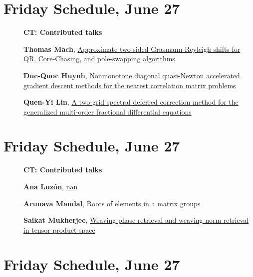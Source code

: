 \documentclass[ILAS2025-program.tex]{subfiles}
\begin{document}
\section*{Friday Schedule, June 27 }
        
        \begin{description}
    \item[] {\color{mstitle}\textbf{CT: Contributed talks}} 
    \item[] \hypertarget{up0410}{}\textbf{Thomas Mach}, \hyperlink{down0410}{Approximate two-sided Grasmann-Reyleigh shifts for QR, Core-Chasing, and pole-swapping algorithms}
        \item[] \hypertarget{up0411}{}\textbf{Duc-Quoc Huynh}, \hyperlink{down0411}{Nonmonotone diagonal quasi-Newton accelerated gradient descent methods for the nearest correlation matrix problems}
        \item[] \hypertarget{up0412}{}\textbf{Quen-Yi Lin}, \hyperlink{down0412}{A two-grid spectral deferred correction method for the generalized multi-order fractional differential equations}
        \end{description}
    \newpage

\section*{Friday Schedule, June 27 }
        
        \begin{description}
    \item[] {\color{mstitle}\textbf{CT: Contributed talks}} 
    \item[] \hypertarget{up0413}{}\textbf{Ana Luzón}, \hyperlink{down0413}{nan}
        \item[] \hypertarget{up0414}{}\textbf{Arunava Mandal}, \hyperlink{down0414}{Roots of elements in a matrix groups}
        \item[] \hypertarget{up0415}{}\textbf{Saikat Mukherjee}, \hyperlink{down0415}{Weaving phase retrieval and weaving norm retrieval in tensor product space}
        \end{description}
    \newpage

\section*{Friday Schedule, June 27 }
        
\end{document}

